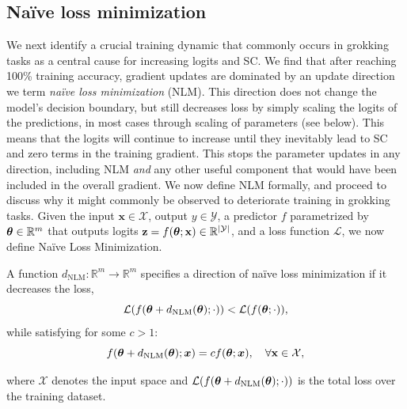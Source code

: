\subsection{Naïve loss minimization}

We next identify a crucial training dynamic that commonly occurs in grokking tasks as a central cause for increasing logits and SC. We find that after reaching 100\% training accuracy, gradient updates are dominated by an update direction we term \textit{naïve loss minimization} (NLM). This direction does not change the model's decision boundary, but still decreases loss by simply scaling the logits of the predictions, in most cases through scaling of parameters (see below). This means that the logits will continue to increase until they inevitably lead to SC and zero terms in the training gradient. This stops the parameter updates in any direction, including NLM \textit{and} any other useful component that would have been included in the overall gradient. We now define NLM formally, and proceed to discuss why it might commonly be observed to deteriorate training in grokking tasks. Given the input $\mathbf{x} \in \mathcal{X}$, output $y \in \mathcal{Y}$, a predictor $f$ parametrized by $\boldsymbol{\theta} \in \mathbb{R}^m$ that outputs logits $\mathbf{z} = f(\boldsymbol{\theta}; \mathbf{x}) \in \mathbb{R}^{|\mathcal{Y}|}$, and a loss function $\mathcal{L}$, we now define Naïve Loss Minimization.

\begin{dfn}
A function $d_\mathrm{NLM}: \mathbb{R}^m \to \mathbb{R}^m$  specifies a direction of naïve loss minimization if it decreases the loss,
\begin{equation}
    \mathcal{L}(f(\boldsymbol{\theta} + d_\mathrm{NLM}(\boldsymbol{\theta});\cdot)) < \mathcal{L}(f(\boldsymbol{\theta};\cdot)),
\end{equation}
while satisfying for some $c>1$:
\begin{equation}
    f(\boldsymbol{\theta} + d_\mathrm{NLM}(\boldsymbol{\theta}); \bm{x}) = c f(\boldsymbol{\theta}; \bm{x}), \quad \forall \mathbf{x} \in \mathcal{X},
\end{equation}

where $\mathcal{X}$ denotes the input space and $\mathcal{L}(f(\boldsymbol{\theta} + d_\mathrm{NLM}(\boldsymbol{\theta});\cdot))$ is the total loss over the training dataset.
\end{dfn}

